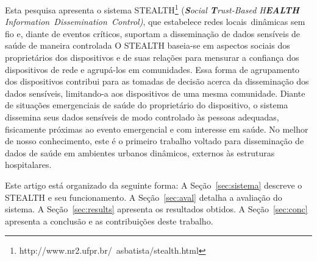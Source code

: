 \documentclass[12pt]{article}
\newcommand{\as}[1]{\textcolor{blue}{{\bf #1}}}
\begin{document}
Esta pesquisa apresenta o sistema \mbox{STEALTH}\footnote{
http://www.nr2.ufpr.br/~asbatista/stealth.html} (\textit{\textbf{S}ocial \textbf{T}rust-Based H\textbf{EALTH} \mbox{Information Dissemination Control)}}, 
que %
estabelece 
redes locais~dinâmicas sem fio e,
diante de eventos críticos, suportam
a disseminação de dados sensíveis de saúde de maneira controlada
O \mbox{STEALTH} baseia-se em aspectos sociais dos proprietários dos dispositivos e de suas relações
para mensurar a confiança dos dispositivos de rede e agrupá-los em comunidades. Essa forma de agrupamento dos dispositivos contribui para as tomadas de decisão acerca da disseminação dos dados sensíveis, limitando-a aos dispositivos de uma mesma comunidade.
Diante
de situações emergenciais de saúde do proprietário do dispositivo, o sistema dissemina seus dados sensíveis de
modo 
controlado às pessoas adequadas,
fisicamente próximas ao evento emergencial e com interesse em saúde. No melhor de nosso conhecimento, este é o primeiro trabalho voltado para disseminação de dados de saúde em ambientes urbanos dinâmicos, externos às estruturas hospitalares. 





Este artigo está organizado da seguinte forma:
A Seção~\ref{sec:sistema} descreve o \mbox{STEALTH} e seu funcionamento. A Seção~\ref{sec:aval} detalha a avaliação do sistema. A Seção~\ref{sec:results} apresenta os resultados obtidos. A Seção~\ref{sec:conc} apresenta a conclusão e as contribuições deste trabalho.
\end{document}
